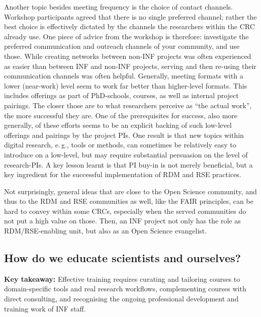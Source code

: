 \documentclass{eceasst}
\newcommand{\eg}{e.\,g.}
\begin{document}
Another topic besides meeting frequency is the choice of contact channels.
Workshop participants agreed that there is no single preferred channel; rather
the best choice is effectively dictated by the channels the researchers within the CRC already use.
One piece of advice from the workshop is therefore: investigate the preferred communication and outreach channels of your community, and use those. 
While creating networks between non-INF projects was often experienced as easier than between INF and non-INF projects, serving and then re-using their communication channels was often helpful.
Generally, meeting formats with a lower (near-work) level seem to work far better than higher-level formats.
This includes offerings as part of PhD-schools, courses, as well as internal project pairings.
The closer those are to what researchers perceive as “the actual work”, the more successful they are.
One of the prerequisites for success, also more generally,
of these efforts seems to be an explicit backing of such low-level offerings and pairings by the project PIs.
One result is that new topics within digital research, \eg, tools or methods, can sometimes be relatively easy to introduce on a low-level, but may require substantial persuasion on the level of research-PIs.
A key lesson learnt is that PI buy-in is not merely beneficial, but a key ingredient for the successful implementation of RDM and RSE practices.

Not surprisingly, general ideas that are close to the Open Science community, and thus to the RDM and RSE communities as well, like the FAIR principles,
can be hard to convey within some CRCs, especially when the served communities do not put a high value on those.
Then, an INF project not only has the role as RDM/RSE-enabling unit, but also as an Open Science evangelist.
\vspace{-2.5em}
\subsection{How do we educate scientists and ourselves?}
\noindent\textbf{Key takeaway:} Effective training requires curating and tailoring courses to domain-specific tools and real research workflows, complementing courses with direct consulting, and recognising the ongoing professional development and training work of INF staff.
\end{document}
